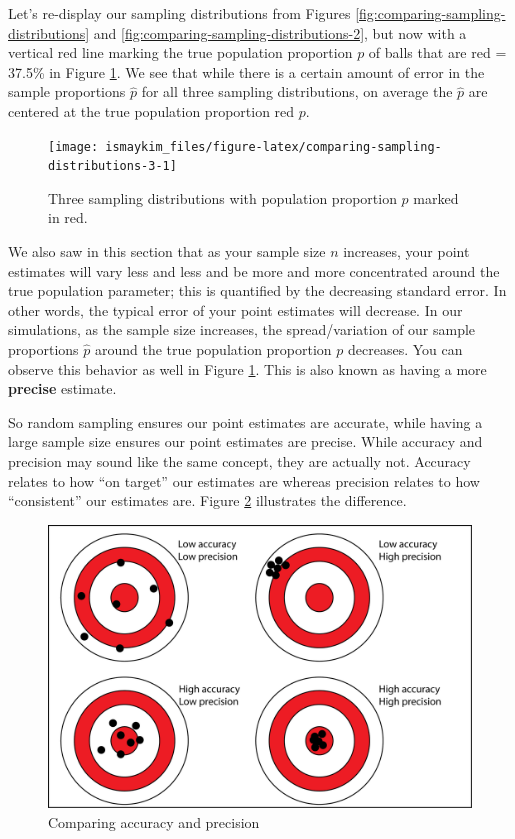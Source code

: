 \documentclass[12pt, krantz2,]{krantz}
\begin{document}
Let's re-display our sampling distributions from Figures \ref{fig:comparing-sampling-distributions} and \ref{fig:comparing-sampling-distributions-2}, but now with a vertical red line marking the true population proportion \(p\) of balls that are red = 37.5\% in Figure \ref{fig:comparing-sampling-distributions-3}. We see that while there is a certain amount of error in the sample proportions \(\widehat{p}\) for all three sampling distributions, on average the \(\widehat{p}\) are centered at the true population proportion red \(p\).

\begin{figure}

{\centering \texttt{[image: ismaykim\_files/figure-latex/comparing-sampling-distributions-3-1]} 

}

\caption{Three sampling distributions with population proportion $p$ marked in red.}\label{fig:comparing-sampling-distributions-3}
\end{figure}

We also saw in this section that as your sample size \(n\) increases, your point estimates will vary less and less and be more and more concentrated around the true population parameter; this is quantified by the decreasing standard error. In other words, the typical error of your point estimates will decrease. In our simulations, as the sample size increases, the spread/variation of our sample proportions \(\widehat{p}\) around the true population proportion \(p\) decreases. You can observe this behavior as well in Figure \ref{fig:comparing-sampling-distributions-3}. This is also known as having a more \textbf{precise} estimate.

So random sampling ensures our point estimates are accurate, while having a large sample size ensures our point estimates are precise. While accuracy and precision may sound like the same concept, they are actually not. Accuracy relates to how ``on target'' our estimates are whereas precision relates to how ``consistent'' our estimates are. Figure \ref{fig:accuracy-vs-precision} illustrates the difference.

\begin{figure}

{\centering \includegraphics[width=0.5\linewidth]{images/accuracy_vs_precision} 

}

\caption{Comparing accuracy and precision}\label{fig:accuracy-vs-precision}
\end{figure}
\end{document}
